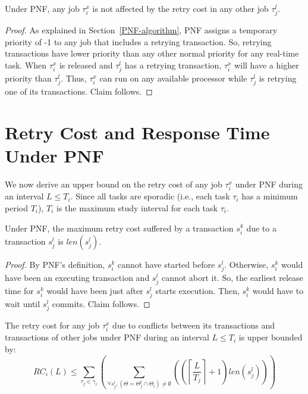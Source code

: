 %
\begin{clm}\label{higher retry does not affect response}
Under PNF, any job $\tau_{i}^{x}$ is not affected by the retry cost in any other
job $\tau_{j}^{l}$.
\end{clm}
%
\begin{proof}\normalfont
As explained in Section~\ref{PNF-algorithm}, PNF assigns a temporary priority of -1 to any job that includes a retrying transaction. So, retrying transactions have lower priority than any other normal priority for any real-time task.
When $\tau_{i}^{x}$ is released and $\tau_j^l$ has a retrying transaction, $\tau_i^x$ will have a higher priority
than $\tau_j^l$. Thus, $\tau_i^x$ can run on any available processor while $\tau_j^l$ is retrying one of its transactions. Claim follows.
\end{proof}
%
\section{Retry Cost and Response Time Under PNF}\label{rc pnf sec}
%
We now derive an upper bound on the retry cost of any job $\tau_i^x$ under PNF during an interval $L\le T_i$. Since all tasks are sporadic (i.e., each task $\tau_i$ has a minimum period $T_i$), $T_i$ is the maximum study interval for each task $\tau_i$.
%
\begin{clm}\label{two transactions retry cost PNF}
%
Under PNF, the maximum retry cost suffered by a transaction $s_{i}^{k}$ due 
to a transaction $s_{j}^{l}$ is $len(s_{j}^{l})$.
\end{clm}
%
\begin{proof}\normalfont
By PNF's definition, $s_{i}^{k}$ cannot have started before
$s_{j}^{l}$. Otherwise, $s_i^k$ would have been an executing transaction and $s_{j}^{l}$ cannot abort it. So, the earliest release time for $s_{i}^{k}$ would have been just after $s_{j}^{l}$ starts execution. Then, $s_i^k$ would have to wait until $s_{j}^{l}$
commits. Claim follows.
\end{proof}
%
\begin{clm}
The retry cost for any job $\tau_{i}^{x}$ due to conflicts between its transactions and transactions of other jobs under PNF during an interval $L\le T_{i}$ is upper bounded by:
%
\begin{equation}
RC_i(L)\le\sum_{\tau_{j}\in\gamma_{i}}\left(\sum_{\forall s_j^l,\left(\Theta=\Theta_j^l \cap \Theta_i\right)\neq \emptyset}\left(\left(\left\lceil \frac{L}{T_{j}}\right\rceil +1\right)len\left(s_{j}^{l}\right)\right)\right)
\label{rc-PNF}
\end{equation}
%
\end{clm}

